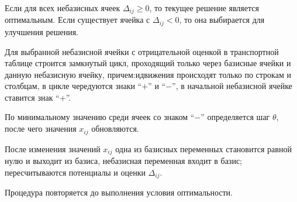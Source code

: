\documentclass[12pt]{article}
\theoremstyle{definition}
\theoremstyle{plain}
\theoremstyle{definition}
\begin{document}
Если для всех небазисных ячеек $\Delta_{ij} \ge 0$,
то текущее решение является оптимальным. Если существует ячейка с $\Delta_{ij} < 0$,
то она выбирается для улучшения решения.

Для выбранной небазисной ячейки с отрицательной оценкой
в транспортной таблице строится замкнутый цикл,
проходящий только через базисные ячейки и данную небазисную ячейку,
причем:идвижения происходят только по строкам и столбцам, в цикле чередуются знаки
``$+$'' и ``$-$'', в начальной небазисной ячейке ставится знак ``$+$''.

По минимальному значению среди ячеек со знаком ``$-$''
определяется шаг $\theta$,
после чего значения $x_{ij}$ обновляются.

После изменения значений $x_{ij}$ одна из базисных переменных
становится равной нулю и выходит из базиса, небазисная переменная входит в базис;
пересчитываются потенциалы и оценки $\Delta_{ij}$.

Процедура повторяется до выполнения условия оптимальности.

















\end{document}
